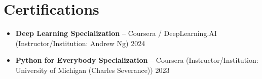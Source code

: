\documentclass[a4paper,10pt]{extarticle}
\newcommand{\resumeSubHeadingListStart}{\begin{itemize}[leftmargin=0in, label={}]}
\newcommand{\resumeSubHeadingListEnd}{\end{itemize}}
\begin{document}
\section{Certifications}
\resumeSubHeadingListStart
\item \textbf{Deep Learning Specialization} -- Coursera / DeepLearning.AI (Instructor/Institution: Andrew Ng) \hfill {2024} \vspace{-2pt}
\item \textbf{Python for Everybody Specialization} -- Coursera (Instructor/Institution: University of Michigan (Charles Severance)) \hfill {2023} \vspace{-2pt}
\resumeSubHeadingListEnd
\end{document}
